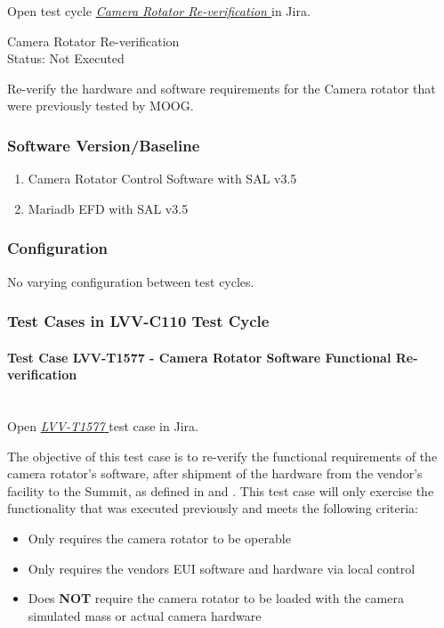 \documentclass[SE,lsstdraft,STR,toc]{lsstdoc}
\providecommand{\tightlist}{
  \setlength{\itemsep}{0pt}\setlength{\parskip}{0pt}}
\begin{document}
Open test cycle {\it \href{https://jira.lsstcorp.org/secure/Tests.jspa#/testrun/LVV-C110}{Camera Rotator Re-verification
}} in Jira.

  Camera Rotator Re-verification
\\
  Status: Not Executed

  Re-verify the hardware and software requirements for the Camera rotator
that were previously tested by MOOG.


  \subsubsection{Software Version/Baseline}
    \begin{enumerate}
\tightlist
\item
  Camera Rotator Control Software with SAL v3.5
\item
  Mariadb EFD with SAL v3.5
\end{enumerate}


  \subsubsection{Configuration}
    No varying configuration between test cycles.


  \subsubsection{Test Cases in LVV-C110 Test Cycle}


    \paragraph{Test Case LVV-T1577 - Camera Rotator Software Functional Re-verification
 }\mbox{}\\

Open  \href{https://jira.lsstcorp.org/secure/Tests.jspa#/testCase/LVV-T1577}{\textit{ LVV-T1577 } }
test case in Jira.

    The objective of this test case is to re-verify the functional
requirements of the camera rotator's software, after shipment of the
hardware from the vendor's facility to the Summit, as defined in 
and . This test case will only exercise the functionality that
was executed previously and meets the following criteria:

\begin{itemize}
\tightlist
\item
  Only requires the camera rotator to be operable
\item
  Only requires the vendors EUI software and hardware via local control
\item
  Does \textbf{NOT} require the camera rotator to be loaded with the
  camera simulated mass or actual camera hardware
\end{itemize}
\end{document}
